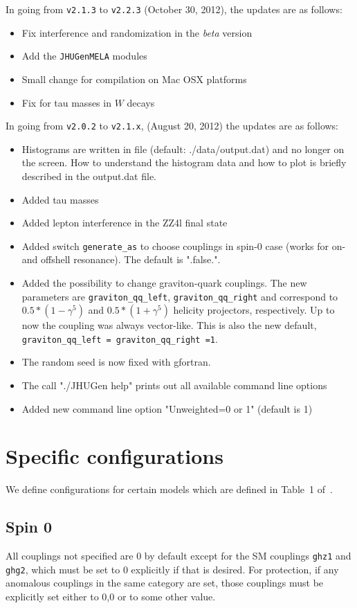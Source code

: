 \documentclass[aps,superscriptaddress,nofootinbib]{revtex4}
\begin{document}
\noindent
In going from \verb|v2.1.3| to \verb|v2.2.3| (October 30, 2012), the updates are as follows:
\begin{itemize}
\item Fix interference and randomization in the {\it{beta}} version
\item Add the \verb|JHUGenMELA| modules
\item Small change for compilation on Mac OSX platforms
\item Fix for tau masses in $W$ decays
\end{itemize}
\noindent
In going from \verb|v2.0.2| to \verb|v2.1.x|, (August 20, 2012) the updates are as follows:
\begin{itemize}
\item Histograms are written in file (default: ./data/output.dat) and no longer on the screen.  How to understand the histogram data and how to plot is briefly described in the output.dat file.
\item Added tau masses
\item Added lepton interference in the ZZ4l final state
\item Added switch \verb|generate_as| to choose couplings in spin-0 case (works for on- and offshell resonance). The default is ".false.".
\item Added the possibility to change graviton-quark couplings. The new parameters are \verb|graviton_qq_left|, \verb|graviton_qq_right| and correspond to $0.5*(1-\gamma^5)$ and $0.5*(1+\gamma^5)$ helicity projectors, respectively. Up to now the coupling was always vector-like. This is also the new default, \verb|graviton_qq_left = graviton_qq_right =1|.
\item The random seed is now fixed with gfortran.
\item The call "./JHUGen help" prints out all available command line options
\item Added new command line option "Unweighted=0 or 1" (default is 1)
\end{itemize}
\clearpage
\appendix
\section{Specific configurations}
We define configurations for certain models which are defined in Table~1 of~\cite{Bolognesi:2012}.
\subsection{Spin 0}
All couplings not specified are 0 by default except for the SM couplings \verb|ghz1| and \verb|ghg2|, which must be set to 0 explicitly if that is desired.  For protection, if any anomalous couplings in the same category are set, those couplings must be explicitly set either to 0,0 or to some other value.
\end{document}
